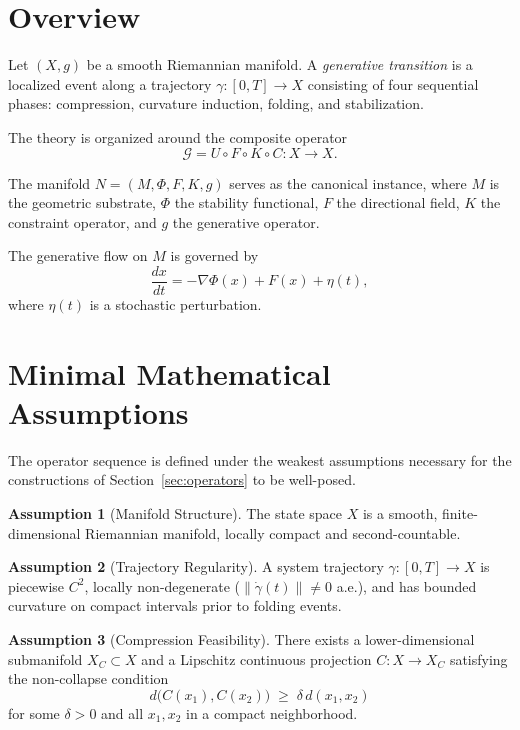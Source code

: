 \documentclass[12pt, oneside]{book}
\theoremstyle{plain}
\theoremstyle{definition}
\newtheorem{assumption}{Assumption}[section]
\theoremstyle{remark}
\begin{document}
\section{Overview}

Let $(X, g)$ be a smooth Riemannian manifold. A \emph{generative
transition} is a localized event along a trajectory
$\gamma : [0,T] \to X$ consisting of four sequential phases:
compression, curvature induction, folding, and stabilization.

The theory is organized around the composite operator
\[
\mathcal{G} = U \circ F \circ K \circ C : X \to X.
\]

The manifold $N = (M, \Phi, F, K, g)$ serves as the canonical
instance, where $M$ is the geometric substrate, $\Phi$ the stability
functional, $F$ the directional field, $K$ the constraint operator,
and $g$ the generative operator.

The generative flow on $M$ is governed by
\[
\frac{dx}{dt} = -\nabla \Phi(x) + F(x) + \eta(t),
\]
where $\eta(t)$ is a stochastic perturbation.

\section{Minimal Mathematical Assumptions}

The operator sequence is defined under the weakest assumptions
necessary for the constructions of Section~\ref{sec:operators} to be
well-posed.

\begin{assumption}[Manifold Structure]\label{ass:manifold}
The state space $X$ is a smooth, finite-dimensional Riemannian
manifold, locally compact and second-countable.
\end{assumption}

\begin{assumption}[Trajectory Regularity]\label{ass:traj}
A system trajectory $\gamma : [0,T] \to X$ is piecewise $C^2$,
locally non-degenerate ($\|\dot\gamma(t)\| \neq 0$ a.e.), and has
bounded curvature on compact intervals prior to folding events.
\end{assumption}

\begin{assumption}[Compression Feasibility]\label{ass:compress}
There exists a lower-dimensional submanifold $X_C \subset X$ and a
Lipschitz continuous projection $C : X \to X_C$ satisfying the
non-collapse condition
\[
d\bigl(C(x_1), C(x_2)\bigr) \;\ge\; \delta\, d(x_1, x_2)
\]
for some $\delta > 0$ and all $x_1, x_2$ in a compact neighborhood.
\end{assumption}
\end{document}
